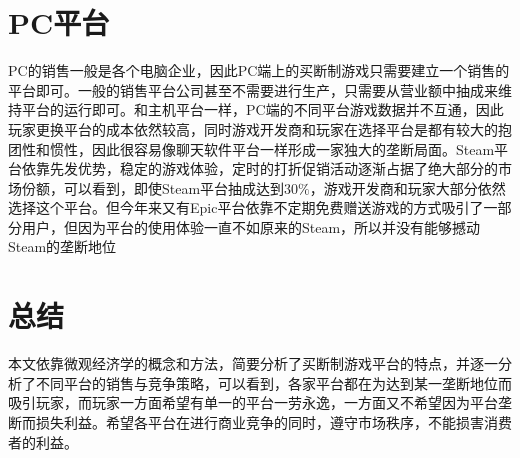 \documentclass{ctexart}
\begin{document}
\section{PC平台}
PC的销售一般是各个电脑企业，因此PC端上的买断制游戏只需要建立一个销售的平台即可。一般的销售平台公司甚至不需要进行生产，只需要从营业额中抽成来维持平台的运行即可。和主机平台一样，PC端的不同平台游戏数据并不互通，因此玩家更换平台的成本依然较高，同时游戏开发商和玩家在选择平台是都有较大的抱团性和惯性，因此很容易像聊天软件平台一样形成一家独大的垄断局面。Steam平台依靠先发优势，稳定的游戏体验，定时的打折促销活动逐渐占据了绝大部分的市场份额，可以看到，即使Steam平台抽成达到$30\%$，游戏开发商和玩家大部分依然选择这个平台。但今年来又有Epic平台依靠不定期免费赠送游戏的方式吸引了一部分用户，但因为平台的使用体验一直不如原来的Steam，所以并没有能够撼动Steam的垄断地位
\section{总结}
本文依靠微观经济学的概念和方法，简要分析了买断制游戏平台的特点，并逐一分析了不同平台的销售与竞争策略，可以看到，各家平台都在为达到某一垄断地位而吸引玩家，而玩家一方面希望有单一的平台一劳永逸，一方面又不希望因为平台垄断而损失利益。希望各平台在进行商业竞争的同时，遵守市场秩序，不能损害消费者的利益。
\end{document}
